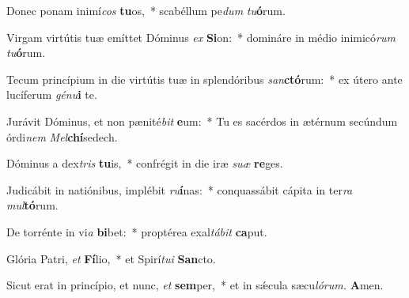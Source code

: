 \item Donec ponam inimí\hspace{0.03em}\textit{cos} \textbf{tu}os,~* scabéllum pe\hspace{0.03em}\textit{dum} \textit{tu}\textbf{ó}rum.
\item Virgam virtútis tuæ emíttet Dóminus \textit{ex} \textbf{Si}on:~* domináre in médio inimicó\textit{rum} \textit{tu}\textbf{ó}rum.
\item Tecum princípium in die virtútis tuæ in splendóribus \textit{san}\textbf{ctó}rum:~* ex útero ante lucíferum \textit{génu}\textbf{i} te.
\item Jurávit Dóminus, et non pænité\textit{bit} \textbf{e}um:~* Tu es sacérdos in ætérnum secúndum órdi\hspace{0.03em}\textit{nem} \textit{Mel}\textbf{chí}sedech.
\item Dóminus a dex\hspace{0.03em}\textit{tris} \textbf{tu}is,~* confrégit in die iræ \textit{suæ} \textbf{re}ges.
\item Judicábit in natiónibus, implébit \textit{ru}\textbf{í}nas:~* conquassábit cápita in ter\textit{ra} \textit{mul}\textbf{tó}rum.
\item De torrénte in vi\textit{a} \textbf{bi}bet:~* proptérea exal\textit{tábit} \textbf{ca}put.
\item Glória Patri, \textit{et} \textbf{Fí}lio,~* et Spirí\hspace{0.03em}\textit{tui} \textbf{San}cto.
\item Sicut erat in princípio, et nunc, \textit{et} \textbf{sem}per,~* et in sǽcula sæcu\hspace{0.03em}\textit{lórum.} \textbf{A}men.